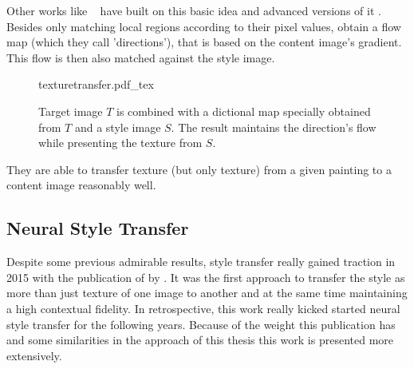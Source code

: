 Other works like \citeauthor*{texturetransfer}~\cite{texturetransfer} have built on this basic idea and advanced versions of it \cite{fasttexturetransfer} \cite{texturetransfer}.
Besides only matching local regions according to their pixel values, \citeauthor*{texturetransfer} obtain a flow map (which they call 'directions'), that is based on the content image's gradient.
This flow is then also matched against the style image.
\begin{figure}
    \begin{tiny}
    \def\svgwidth{\textwidth}
    {texturetransfer.pdf_tex}
    \end{tiny}
    \caption[]{Target image $T$ is combined with a dictional map specially obtained from $T$ and a style image  $S$. The result maintains the direction's flow while presenting the texture from $S$.}
\end{figure}
They are able to transfer texture (but only texture) from a given painting to a content image reasonably well.





\subsection{Neural Style Transfer}
Despite some previous admirable results\cite{texturetransfer}, style transfer really gained traction in 2015 with the publication of  by \citeauthor*{gatys}.
It was the first approach to transfer the style as more than just texture of one image to another and at the same time maintaining a high contextual fidelity.
In retrospective, this work really kicked started neural style transfer for the following years.
Because of the weight this publication has and some similarities in the approach of this thesis this work is presented more extensively.


